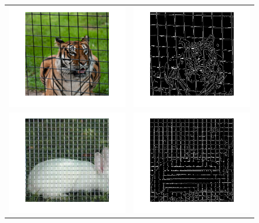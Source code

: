 \begin{figure}[ht!]
\centering
\begin{tabular}{cc}
\includegraphics[width = .5\columnwidth]{fig/tigre_rescale.png} &
\includegraphics[width = .5\columnwidth]{fig/contour.png} \\
\includegraphics[width = .5\columnwidth]{fig/lapin_rescale.png} &
\includegraphics[width = .5\columnwidth]{fig/contour_lapin.png} \\

\end{tabular}
\end{figure}
